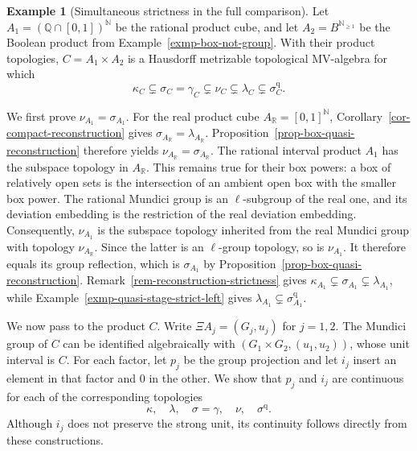 \documentclass[preprint,3p]{elsarticle}
\theoremstyle{plain}
\theoremstyle{definition}
\newtheorem{exmp}[thm]{Example}
\numberwithin{equation}{section}
\begin{document}
\begin{exmp}[Simultaneous strictness in the full comparison]
\label{exmp-all-reconstruction-inclusions-strict}
Let $A_1=(\mathbb Q\cap[0,1])^{\mathbb N}$ be the rational product
cube, and let $A_2=B^{\mathbb N_{\geq1}}$ be the Boolean product
from Example~\ref{exmp-box-not-group}.
With their product topologies, $C=A_1\times A_2$ is a Hausdorff
metrizable topological MV-algebra for which
\begin{equation}
\label{eq-all-reconstruction-inclusions-strict}
 \kappa_C\subsetneq\sigma_C=\gamma_C
 \subsetneq\nu_C\subsetneq\lambda_C
 \subsetneq\sigma_C^{\mathrm q}.
\end{equation}

We first prove $\nu_{A_1}=\sigma_{A_1}$.
For the real product cube $A_{\mathbb R}=[0,1]^{\mathbb N}$,
Corollary~\ref{cor-compact-reconstruction} gives
$\sigma_{A_{\mathbb R}}=\lambda_{A_{\mathbb R}}$.
Proposition~\ref{prop-box-quasi-reconstruction} therefore yields
$\nu_{A_{\mathbb R}}=\sigma_{A_{\mathbb R}}$.
The rational interval product $A_1$ has the subspace topology in
$A_{\mathbb R}$.  This remains true for their box powers:
a box of relatively open sets is the intersection of an ambient
open box with the smaller box power.
The rational Mundici group is an $\ell$-subgroup of the real one,
and its deviation embedding is the restriction of the real
deviation embedding.  Consequently, $\nu_{A_1}$ is the subspace
topology inherited from the real Mundici group with topology
$\nu_{A_{\mathbb R}}$.
Since the latter is an $\ell$-group topology, so is $\nu_{A_1}$.
It therefore equals its group reflection, which is $\sigma_{A_1}$
by Proposition~\ref{prop-box-quasi-reconstruction}.
Remark~\ref{rem-reconstruction-strictness} gives
$\kappa_{A_1}\subsetneq\sigma_{A_1}\subsetneq\lambda_{A_1}$, while
Example~\ref{exmp-quasi-stage-strict-left} gives
$\lambda_{A_1}\subsetneq\sigma_{A_1}^{\mathrm q}$.

We now pass to the product $C$.
Write $\Xi A_j=(G_j,u_j)$ for $j=1,2$.
The Mundici group of $C$ can be identified algebraically with
$(G_1\times G_2,(u_1,u_2))$, whose unit interval is $C$.
For each factor, let $p_j$ be the group projection and let $i_j$
insert an element in that factor and $0$ in the other.
We show that $p_j$ and $i_j$ are continuous for each of the
corresponding topologies
\[
 \kappa,\quad\lambda,\quad\sigma=\gamma,
 \quad\nu,\quad\sigma^{\mathrm q}.
\]
Although $i_j$ does not preserve the strong unit, its continuity
follows directly from these constructions.


\end{exmp}
\end{document}
